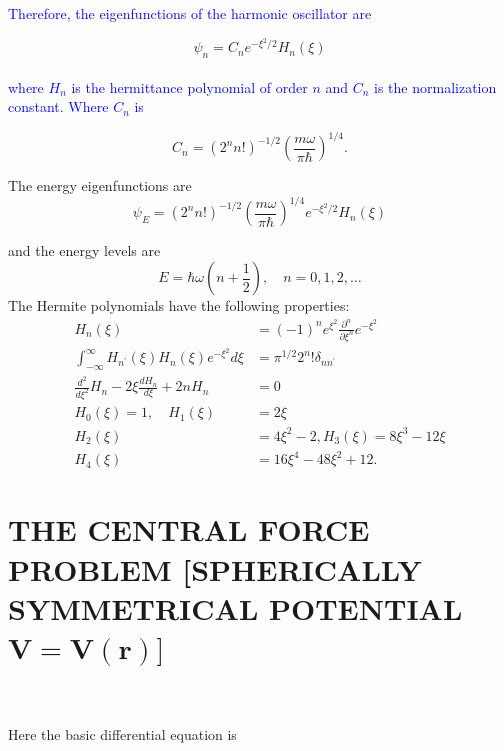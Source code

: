 \documentclass{article}
\begin{document}
\textcolor{blue}{Therefore, the eigenfunctions of the harmonic oscillator are}

\begin{equation}
    \psi_{n}=C_{n} e^{-\xi^{2} / 2} H_{n}(\xi)
\end{equation}
\\
\textcolor{blue}{where $H_{n}$ is the hermittance polynomial of order $n$ and $C_n$ is the normalization constant. Where $C_n$ is} 

\begin{equation}
    C_n = \left(2^{n} n !\right)^{-1 / 2}\left(\frac{m \omega}{\pi \hbar}\right)^{1 / 4}.
\end{equation}

The energy eigenfunctions are
\begin{equation}
\psi_{E}=\left(2^{n} n !\right)^{-1 / 2}\left(\frac{m \omega}{\pi \hbar}\right)^{1 / 4} e^{-\xi^{2} / 2} H_{n}(\xi)
\end{equation}

and the energy levels are
\begin{equation}
E=\hbar \omega\left(n+\frac{1}{2}\right), \quad n=0,1,2, \ldots
\end{equation}
The Hermite polynomials have the following properties:
\begin{equation}
\begin{aligned}
H_{n}(\xi) &=(-1)^{n} e^{\xi^{2}} \frac{\partial^{n}}{\partial \xi^{n}} e^{-\xi^{2}} \\
\int_{-\infty}^{\infty} H_{n^{\prime}}(\xi) H_{n}(\xi) e^{-\xi^{2}} d \xi &=\pi^{1 / 2} 2^{n} ! \delta_{n n^{\prime}} \\
\frac{d^{2}}{d \xi^{2}} H_{n}-2 \xi \frac{d H_{n}}{d \xi}+2 n H_{n} &=0 \\
H_{0}(\xi)=1, \quad H_{1}(\xi) &=2 \xi \\
H_{2}(\xi) &=4 \xi^{2}-2, H_{3}(\xi)=8 \xi^{3}-12 \xi \\
H_{4}(\xi) &=16 \xi^{4}-48 \xi^{2}+12.
\end{aligned}
\end{equation}
\section{THE CENTRAL FORCE PROBLEM [SPHERICALLY SYMMETRICAL POTENTIAL $\boldsymbol{V}=\boldsymbol{V}(\boldsymbol{r})]$}
\\
\\
Here the basic differential equation is
\end{document}
